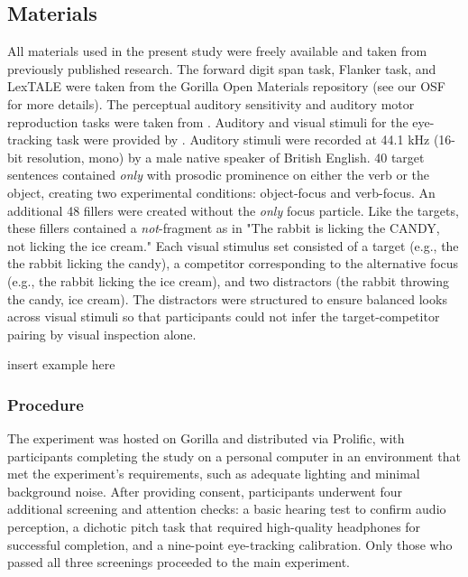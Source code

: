 \subsection{Materials}
All materials used in the present study were freely available and taken from previously published research. The forward digit span task, Flanker task, and LexTALE \citep{lemhofer2012introducing} were taken from the Gorilla \citep{Anwyl-Irvine_2019} Open Materials repository (see our OSF for more details). The perceptual auditory sensitivity and auditory motor reproduction tasks were taken from \cite{Kachlicka_Saito_Tierney_2019, saito2020domain}. Auditory and visual stimuli for the eye-tracking task were provided by \cite{Ge_etal_2021}. Auditory stimuli were recorded at 44.1 kHz (16-bit resolution, mono) by a male native speaker of British English. 40 target sentences contained \textit{only} with prosodic prominence on either the verb or the object, creating two experimental conditions: object-focus and verb-focus. An additional 48 fillers were created without the \textit{only} focus particle. Like the targets, these fillers contained a \textit{not}-fragment as in "The rabbit is licking the CANDY, not licking the ice cream." Each visual stimulus set consisted of a target (e.g., the the rabbit licking the candy), a competitor corresponding to the alternative focus (e.g., the rabbit licking the ice cream), and two distractors (the rabbit throwing the candy, ice cream). The distractors were structured to ensure balanced looks across visual stimuli so that participants could not infer the target-competitor pairing by visual inspection alone.

insert example here

\subsubsection{Procedure}

The experiment was hosted on Gorilla \citep{Anwyl-Irvine_2019} and distributed via Prolific, with participants completing the study on a personal computer in an environment that met the experiment’s requirements, such as adequate lighting and minimal background noise. After providing consent, participants underwent four additional screening and attention checks: a basic hearing test to confirm audio perception, a dichotic pitch task \citep{milne_2021} that required high-quality headphones for successful completion, and a nine-point eye-tracking calibration. Only those who passed all three screenings proceeded to the main experiment.

